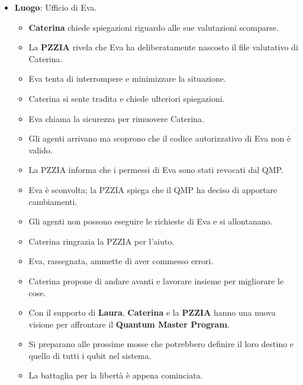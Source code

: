 \begin{itemize}
\item \textbf{Luogo}: Ufficio di Eva.
\begin{itemize}
\item \textbf{Caterina} chiede spiegazioni riguardo alle sue valutazioni scomparse.
    \item La \textbf{PZZIA} rivela che Eva ha deliberatamente nascosto il file valutativo di Caterina.
    \item Eva tenta di interrompere e minimizzare la situazione.
    \item Caterina si sente tradita e chiede ulteriori spiegazioni.
    \item Eva chiama la sicurezza per rimuovere Caterina.
    \item Gli agenti arrivano ma scoprono che il codice autorizzativo di Eva non è valido.
    \item La PZZIA informa che i permessi di Eva sono stati revocati dal QMP.
    \item Eva è sconvolta; la PZZIA spiega che il QMP ha deciso di apportare cambiamenti.
    \item Gli agenti non possono eseguire le richieste di Eva e si allontanano.
    \item Caterina ringrazia la PZZIA per l'aiuto.
    \item Eva, rassegnata, ammette di aver commesso errori.
    \item Caterina propone di andare avanti e lavorare insieme per migliorare le cose.
\end{itemize}



\begin{itemize}
    \item Con il supporto di \textbf{Laura}, \textbf{Caterina} e la \textbf{PZZIA} hanno una nuova visione per affrontare il \textbf{Quantum Master Program}.
    \item Si preparano alle prossime mosse che potrebbero definire il loro destino e quello di tutti i qubit nel sistema.
    \item La battaglia per la libertà è appena cominciata.
\end{itemize}
\end{itemize}


